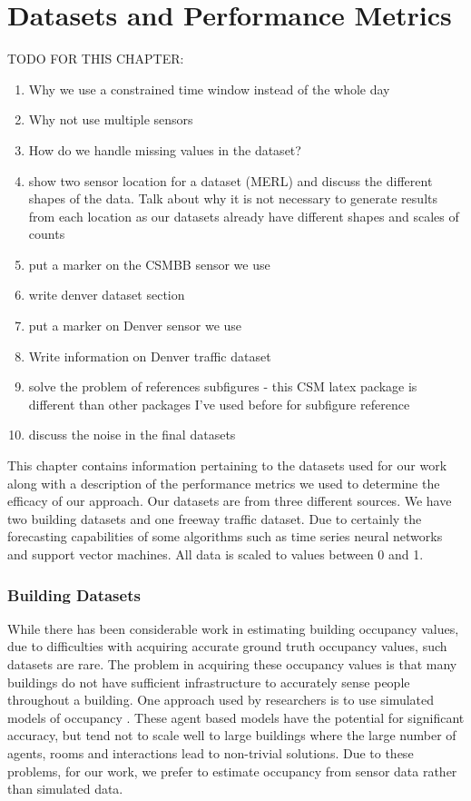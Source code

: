 \chapter{Datasets and Performance Metrics}

TODO FOR THIS CHAPTER:
\begin{enumerate}
	\item Why we use a constrained time window instead of the whole day
	\item Why not use multiple sensors
	\item How do we handle missing values in the dataset?
	\item show two sensor location for a dataset (MERL) and discuss the different shapes of the data.  Talk about why it is not necessary to generate results from each location as our datasets already have different shapes and scales of counts
	\item put a marker on the CSMBB sensor we use
	\item write denver dataset section
	\item put a marker on Denver sensor we use
	\item Write information on Denver traffic dataset
	\item solve the problem of references subfigures - this CSM latex package is different than other packages I've used before for subfigure reference
	\item discuss the noise in the final datasets
\end{enumerate}

This chapter contains information pertaining to the datasets used for our work along with a description of the performance metrics  we used to determine the efficacy of our approach.  Our datasets are from three different sources.  We have two building datasets and one freeway traffic dataset.  Due to certainly the forecasting capabilities of some algorithms such as time series neural networks and support vector machines.  All data is scaled to values between 0 and 1.

\subsection{Building Datasets}
While there has been considerable work in estimating building occupancy values, due to difficulties with acquiring accurate ground truth occupancy values, such datasets are rare.  The problem in acquiring these occupancy values is that many buildings do not have sufficient infrastructure to accurately sense people throughout a building.  One approach used by researchers is to use simulated models of occupancy \cite{page2008, goldstein2010}.  These agent based models have the potential for significant accuracy, but tend not to scale well to large buildings where the large number of agents, rooms and interactions lead to non-trivial solutions.  Due to these problems, for our work, we prefer to estimate occupancy from sensor data rather than simulated data.

